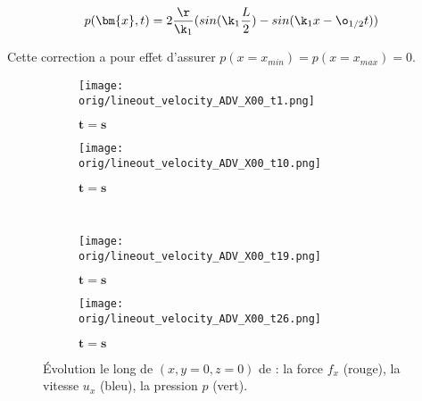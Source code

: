 \begin{align}
p(\bm{x},t) = 2 \frac{\r}{\k_1} (sin(\k_1 \frac{L}{2})- sin(\k_1 x - \o_{1/2} t) )
\end{align}

Cette correction a pour effet d'assurer $p(x=x_{min}) = p(x=x_{max}) = 0$.

\begin{figure}
\begin{center}
	\begin{subfigure}[t]{0.4\textwidth}                                                                                                                                   
		\texttt{[image: \\orig/lineout\_velocity\_ADV\_X00\_t1.png]}
		\caption{ $\bm{t=s}$}
		\label{fig : X00_t1}
	\end{subfigure}\hfill
	\begin{subfigure}[t]{0.4\textwidth}
		\texttt{[image: \\orig/lineout\_velocity\_ADV\_X00\_t10.png]}
		\caption{ $\bm{t=s}$}
		\label{fig : X00_t6}
	\end{subfigure}
\\
	\begin{subfigure}[t]{0.4\textwidth}
		\texttt{[image: \\orig/lineout\_velocity\_ADV\_X00\_t19.png]}
		\caption{ $\bm{t=s}$}
		\label{fig : X00_t11}
	\end{subfigure}\hfill
	\begin{subfigure}[t]{0.4\textwidth}
		\texttt{[image: \\orig/lineout\_velocity\_ADV\_X00\_t26.png]}
		\caption{ $\bm{t=s}$}
		\label{fig : X00_t16}
	\end{subfigure}
\end{center}
\caption{Évolution le long de $(x,y=0,z=0)$ de : la force $f_x$ (rouge), la vitesse $u_x$ (bleu), la pression $p$ (vert).}
\label{fig : X00_u}
\end{figure}


